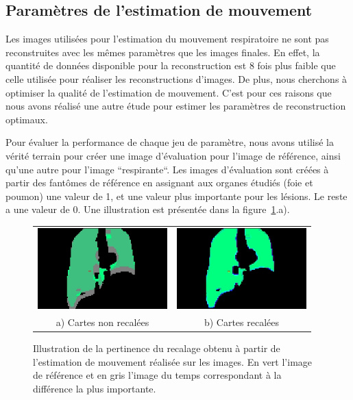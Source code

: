 \subsection{Paramètres de l'estimation de mouvement}

Les images utilisées pour l'estimation du mouvement respiratoire ne sont pas reconstruites avec les mêmes paramètres que les images finales. En effet, la quantité de données disponible pour la reconstruction est 8 fois plus faible que celle utilisée pour réaliser les reconstructions d'images. De plus, nous cherchons à optimiser la qualité de l'estimation de mouvement. C'est pour ces raisons que nous avons réalisé une autre étude pour estimer les paramètres de reconstruction optimaux. 

Pour évaluer la performance de chaque jeu de paramètre, nous avons utilisé la vérité terrain pour créer une image d'évaluation pour l'image de référence, ainsi qu'une autre pour l'image ``respirante``. Les images d'évaluation sont créées à partir des fantômes de référence en assignant aux organes étudiés (foie et poumon) une valeur de 1, et une valeur plus importante pour les lésions. Le reste a une valeur de 0. Une illustration est présentée dans la figure~\ref{lab:illustrationRecalage}.a). 

\begin{figure}
\centering
\begin{tabular}{c c}
	\includegraphics[width=5cm]{images/sansCorrection} & \includegraphics[width=5cm]{images/avecCorrection} \\
	a) Cartes non recalées				& b) Cartes recalées
\end{tabular}
\caption[Illustration du recalage obtenu]{Illustration de la pertinence du recalage obtenu à partir de l'estimation de mouvement réalisée sur les images. En vert l'image de référence et en gris l'image du temps correspondant à la différence la plus importante. }
\label{lab:illustrationRecalage}
\end{figure}

